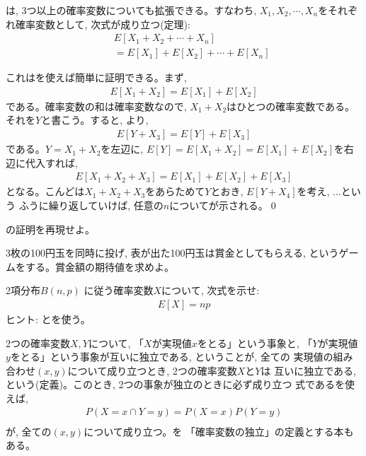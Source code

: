 は, 3つ以上の確率変数についても拡張できる。すなわち, 
$X_1, X_2, \cdots, X_n$をそれぞれ確率変数として, 次式が成り立つ(定理):
\begin{eqnarray}
&&E[X_1+X_2+\cdots+X_n]\nonumber\\
&&=E[X_1]+E[X_2]+\cdots+E[X_n]\label{eq:expect_Xsum}
\end{eqnarray}

これはを使えば簡単に証明できる。まず, 
\begin{eqnarray}E[X_1+X_2]=E[X_1]+E[X_2]\end{eqnarray}
である。確率変数の和は確率変数なので, $X_1+X_2$はひとつの確率変数である。それを$Y$と書こう。すると, 
より, 
\begin{eqnarray}E[Y+X_3]=E[Y]+E[X_3]\end{eqnarray}
である。$Y=X_1+X_2$を左辺に, $E[Y]=E[X_1+X_2]=E[X_1]+E[X_2]$を右辺に代入すれば, 
\begin{eqnarray*}E[X_1+X_2+X_3]=E[X_1]+E[X_2]+E[X_3]\end{eqnarray*}
となる。こんどは$X_1+X_2+X_3$をあらためて$Y$とおき, $E[Y+X_4]$を考え, ...という
ふうに繰り返していけば, 任意の$n$についてが示される。\qed
\mv

\begin{q}\label{q:stat_expect_X_plus_Y} の証明を再現せよ。\end{q}
\mv

\begin{q}\label{q:stat_3coins} 3枚の100円玉を同時に投げ, 表が出た100円玉は賞金としてもらえる, 
というゲームをする。賞金額の期待値を求めよ。
\end{q}
\mv

\begin{q}\label{q:stat_binomial_exp} 2項分布$B(n, p)$
に従う確率変数$X$について, 次式を示せ:
\begin{eqnarray}
E[X]=np\label{eq:stat_binomial_exp}
\end{eqnarray}
ヒント: とを使う。
\end{q}\mv

2つの確率変数$X, Y$について, 「$X$が実現値$x$をとる」という事象と, 
「$Y$が実現値$y$をとる」という事象が互いに独立である, ということが, 全ての
実現値の組み合わせ$(x, y)$について成り立つとき, 2つの確率変数$X$と$Y$は
互いに独立である, という(定義)。このとき, 2つの事象が独立のときに必ず成り立つ
式であるを使えば, 
\begin{eqnarray}P(X=x \cap Y=y)=P(X=x)P(Y=y)\nonumber\\\label{eq:X_Y_independent_PXPY}\end{eqnarray}
が, 全ての$(x, y)$について成り立つ。を
「確率変数の独立」の定義とする本もある。\\


